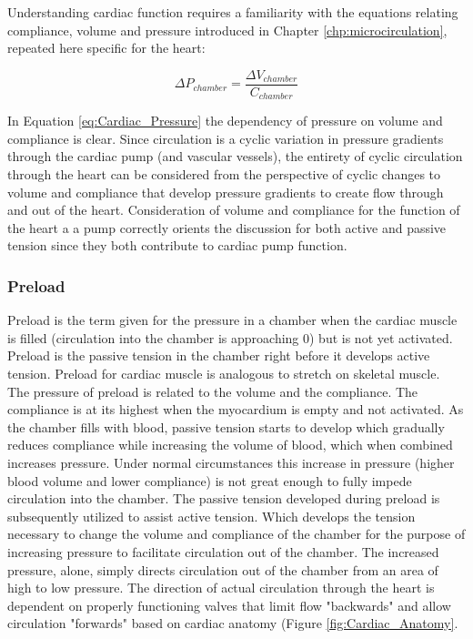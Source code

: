 Understanding cardiac function requires a familiarity with the equations relating compliance, volume and pressure introduced in Chapter \ref{chp:microcirculation}, repeated here specific for the heart:

\begin{equation}
    \Delta P_{chamber} = \frac{\Delta V_{chamber}}{C_{chamber}}
    \label{eq:Cardiac_Pressure}
\end{equation}

In Equation \ref{eq:Cardiac_Pressure} the dependency of pressure on volume and compliance is clear. Since circulation is a cyclic variation in pressure gradients through the cardiac pump (and vascular vessels), the entirety of cyclic circulation through the heart can be considered from the perspective of cyclic changes to volume and compliance that develop pressure gradients to create flow through and out of the heart. Consideration of volume and compliance for the function of the heart a a pump correctly orients the discussion for both active and passive tension since they both contribute to cardiac pump function.

\subsubsection{Preload}

Preload is the term given for the pressure in a chamber when the cardiac muscle is filled (circulation into the chamber is approaching 0) but is not yet activated. Preload is the passive tension in the chamber right before it develops active tension. Preload for cardiac muscle is analogous to stretch on skeletal muscle. The pressure of preload is related to the volume and the compliance. The compliance is at its highest when the myocardium is empty and not activated. As the chamber fills with blood, passive tension starts to develop which gradually reduces compliance while increasing the volume of blood, which when combined increases pressure. Under normal circumstances this increase in pressure (higher blood volume and lower compliance) is not great enough to fully impede circulation into the chamber. The passive tension developed during preload is subsequently utilized to assist active tension. Which develops the tension necessary to change the volume and compliance of the chamber for the purpose of increasing pressure to facilitate circulation out of the chamber. The increased pressure, alone, simply directs circulation out of the chamber from an area of high to low pressure. The direction of actual circulation through the heart is dependent on properly functioning valves that limit flow "backwards" and allow circulation "forwards" based on cardiac anatomy (Figure \ref{fig:Cardiac_Anatomy}.

